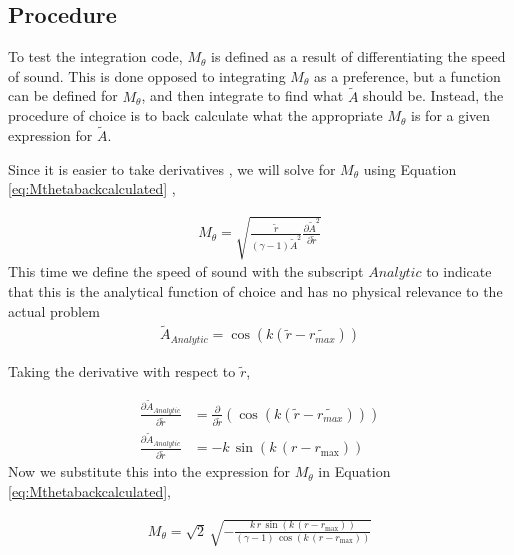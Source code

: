 \subsection{Procedure}


To test the integration code,  $M_{\theta}$ is defined as a result 
of differentiating the speed of sound. This is done opposed to integrating
$M_{\theta}$ as a preference, but a function can be defined for $M_{\theta}$, and 
then integrate to find what $\widetilde{A}$ should be. 
Instead, the procedure of choice is to back calculate what the appropriate 
$M_{\theta}$ is for a given expression for $\widetilde{A}$.

Since it is easier to take derivatives , we will solve for $M_{\theta}$ using 
Equation \ref{eq:Mthetabackcalculated} ,

\begin{align*}
    M_{\theta} = \sqrt{ \frac{\widetilde{r}}{(\gamma -1) \widetilde{A}^2} 
    \frac{\partial \widetilde{A}^2}{\partial \widetilde{r}}}
\end{align*}
This time we define the speed of sound with the subscript $Analytic$ to indicate 
that this is the analytical function of choice and has no physical relevance 
to the actual problem
\begin{align*}
    \widetilde{A}_{Analytic} = \cos \left( k \left( \widetilde{r} - \widetilde{r_{max}} \right) \right)
\end{align*}

Taking the derivative with respect to $\widetilde{r}$,

\begin{align*}
    \frac{\partial \widetilde{A}_{Analytic} }{\partial \widetilde{r}} &= 
    \frac{\partial }{\partial \widetilde{r}}\left( 
        \cos \left( k \left( \widetilde{r} - \widetilde{r_{max}} \right) \right)
    \right)\\
    \frac{\partial \widetilde{A}_{Analytic}}{\partial \widetilde{r}} &= 
    -k\,\sin\left(k\,\left(r-r_{\mathrm{max}}\right)\right)
\end{align*}
Now we substitute this into the expression for $M_{\theta}$ in Equation 
\ref{eq:Mthetabackcalculated},

\begin{align*}
    M_{\theta} = \sqrt{2}\,\sqrt{-\frac{k\,r\,\sin\left(k\,\left(r-r_{\mathrm{max}}\right)\right)}{(\gamma - 1)\,\cos\left(k\,\left(r-r_{\mathrm{max}}\right)\right)}}
\end{align*} 



